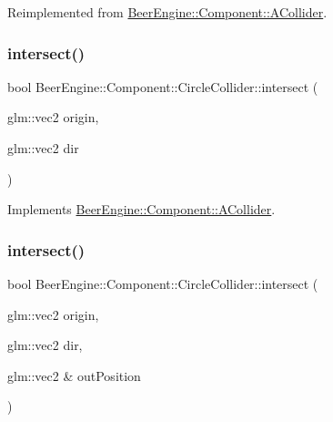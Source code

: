 Reimplemented from \mbox{\hyperlink{class_beer_engine_1_1_component_1_1_a_collider_ac6bad21e0cfe7f95c431b9a7a59c550c}{Beer\+Engine\+::\+Component\+::\+A\+Collider}}.

\mbox{\label{class_beer_engine_1_1_component_1_1_circle_collider_a60737b2c9898672d28aa09b56c7fa07c}} 
\subsubsection{\texorpdfstring{intersect()}{intersect()}\hspace{0.1cm}{\footnotesize\ttfamily [1/2]}}
{\footnotesize\ttfamily bool Beer\+Engine\+::\+Component\+::\+Circle\+Collider\+::intersect (\begin{DoxyParamCaption}\item[{glm\+::vec2}]{origin,  }\item[{glm\+::vec2}]{dir }\end{DoxyParamCaption})\hspace{0.3cm}{\ttfamily [virtual]}}



Implements \mbox{\hyperlink{class_beer_engine_1_1_component_1_1_a_collider_a84f924f6c0631f5f17b4e1852495a505}{Beer\+Engine\+::\+Component\+::\+A\+Collider}}.

\mbox{\label{class_beer_engine_1_1_component_1_1_circle_collider_a0402e8e6605a5c2c7aefa9befdcd15e5}} 
\subsubsection{\texorpdfstring{intersect()}{intersect()}\hspace{0.1cm}{\footnotesize\ttfamily [2/2]}}
{\footnotesize\ttfamily bool Beer\+Engine\+::\+Component\+::\+Circle\+Collider\+::intersect (\begin{DoxyParamCaption}\item[{glm\+::vec2}]{origin,  }\item[{glm\+::vec2}]{dir,  }\item[{glm\+::vec2 \&}]{out\+Position }\end{DoxyParamCaption})\hspace{0.3cm}{\ttfamily [virtual]}}



